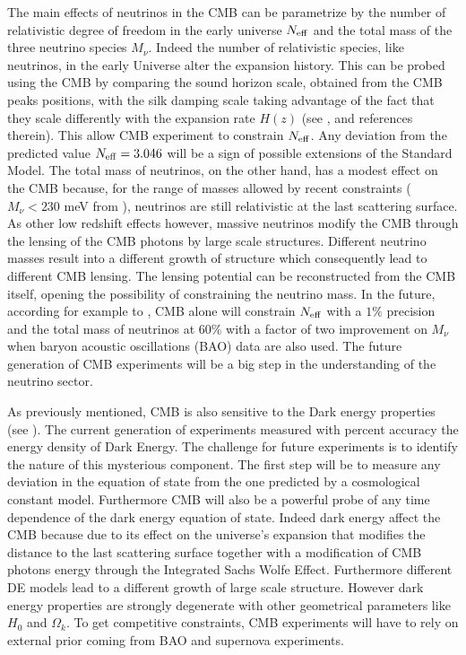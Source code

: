 \documentclass[aps,prd,reprint,superscriptaddress]{revtex4-1}
\begin{document}
The main effects of neutrinos in the CMB can be parametrize by the number of relativistic degree of freedom in the early universe $N_{\rm eff}$ and the total mass of the three neutrino species $M_{\nu}$.
Indeed the number of relativistic species, like neutrinos, in the early Universe alter the expansion history. This can be probed using the CMB by comparing the sound horizon scale, obtained from the CMB peaks positions, with the silk damping scale taking advantage of the fact that they scale differently with the expansion rate $H(z)$ 
(see \cite{2013arXiv1309.5383A}, \cite{2013PhRvD..87h3008H} and references therein). 
This allow CMB experiment to constrain $N_{\rm eff}$. Any deviation from the predicted value $N_{\rm eff}=3.046$ will be a sign of possible extensions of the Standard Model.
The total mass of neutrinos, on the other hand, has a modest effect on the CMB because, for the range of masses allowed by recent constraints ($M_{\nu}<230$ meV from \cite{2014A&A...571A..16P}), neutrinos are still relativistic at the last scattering surface. As other low redshift effects however, massive neutrinos modify the CMB through the lensing of the CMB photons by large scale structures. Different neutrino masses result into a different growth of structure which consequently lead to different CMB lensing. The lensing potential can be reconstructed from the CMB itself, opening the possibility of constraining the neutrino mass. 
In the future, according for example to \cite{wu:2014}, CMB alone will constrain $N_{\rm eff}$ with a $1\%$ precision and the total mass of neutrinos at $60\%$ with a factor of two improvement on $M_{\nu}$ when baryon acoustic oscillations (BAO) data are also used. The future generation of CMB experiments will be a big step in the understanding of the neutrino sector.

As previously mentioned, CMB is also sensitive to  the Dark energy properties (see \cite{2010MNRAS.405.2639J}). The current generation of experiments measured with percent accuracy the energy density of Dark Energy. The challenge for future experiments is to identify the nature of this mysterious component. The first step will be to measure any deviation in the equation of state from the one predicted by a cosmological constant model. Furthermore CMB will also be a powerful probe of any time dependence of the dark energy equation of state.
Indeed dark energy affect the CMB because due to its effect on the universe's expansion that modifies the distance to the last scattering surface together with a modification  of CMB photons energy through the Integrated Sachs Wolfe Effect. Furthermore different DE models lead to a different growth of large scale structure. However dark energy properties are strongly degenerate with other geometrical parameters like $H_{0}$ and $\Omega_{k}$. To get competitive constraints, CMB experiments will have to rely on external prior coming from BAO and supernova experiments.
\end{document}
